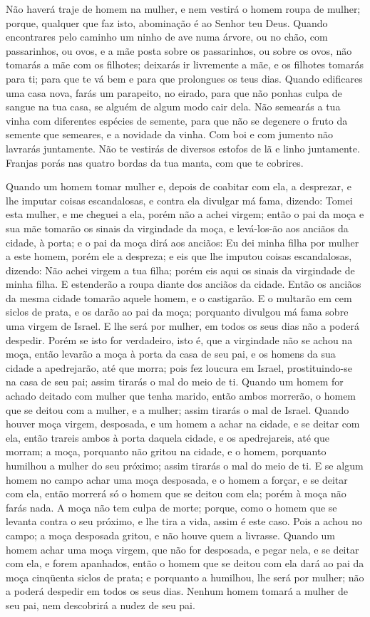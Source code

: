 Não haverá traje de homem na mulher, e nem vestirá o homem roupa
de mulher; porque, qualquer que faz isto, abominação é ao Senhor teu
Deus. Quando encontrares pelo caminho um ninho de ave numa
árvore, ou no chão, com passarinhos, ou ovos, e a mãe posta sobre os
passarinhos, ou sobre os ovos, não tomarás a mãe com os filhotes;
deixarás ir livremente a mãe, e os filhotes tomarás para ti;
para que te vá bem e para que prolongues os teus dias. Quando
edificares uma casa nova, farás um parapeito, no eirado, para que
não ponhas culpa de sangue na tua casa, se alguém de algum modo cair
dela. Não semearás a tua vinha com diferentes espécies de
semente, para que não se degenere o fruto da semente que semeares, e
a novidade da vinha. Com boi e com jumento não lavrarás
juntamente. Não te vestirás de diversos estofos de lã e linho
juntamente. Franjas porás nas quatro bordas da tua manta, com
que te cobrires.

Quando um homem tomar mulher e, depois de coabitar com ela, a
desprezar, e lhe imputar coisas escandalosas, e contra ela
divulgar má fama, dizendo: Tomei esta mulher, e me cheguei a ela,
porém não a achei virgem; então o pai da moça e sua mãe
tomarão os sinais da virgindade da moça, e levá-los-ão aos anciãos
da cidade, à porta; e o pai da moça dirá aos anciãos: Eu dei
minha filha por mulher a este homem, porém ele a despreza; e
eis que lhe imputou coisas escandalosas, dizendo: Não achei virgem a
tua filha; porém eis aqui os sinais da virgindade de minha filha. E
estenderão a roupa diante dos anciãos da cidade. Então os
anciãos da mesma cidade tomarão aquele homem, e o castigarão.
E o multarão em cem siclos de prata, e os darão ao pai da
moça; porquanto divulgou má fama sobre uma virgem de Israel. E lhe
será por mulher, em todos os seus dias não a poderá despedir.
Porém se isto for verdadeiro, isto é, que a virgindade não se
achou na moça, então levarão a moça à porta da casa de seu
pai, e os homens da sua cidade a apedrejarão, até que morra; pois
fez loucura em Israel, prostituindo-se na casa de seu pai; assim
tirarás o mal do meio de ti. Quando um homem for achado
deitado com mulher que tenha marido, então ambos morrerão, o homem
que se deitou com a mulher, e a mulher; assim tirarás o mal de
Israel. Quando houver moça virgem, desposada, e um homem a
achar na cidade, e se deitar com ela, então trareis ambos à
porta daquela cidade, e os apedrejareis, até que morram; a moça,
porquanto não gritou na cidade, e o homem, porquanto humilhou a
mulher do seu próximo; assim tirarás o mal do meio de ti. E
se algum homem no campo achar uma moça desposada, e o homem a
forçar, e se deitar com ela, então morrerá só o homem que se deitou
com ela; porém à moça não farás nada. A moça não tem culpa de
morte; porque, como o homem que se levanta contra o seu próximo, e
lhe tira a vida, assim é este caso. Pois a achou no campo; a
moça desposada gritou, e não houve quem a livrasse. Quando um
homem achar uma moça virgem, que não for desposada, e pegar nela, e
se deitar com ela, e forem apanhados, então o homem que se
deitou com ela dará ao pai da moça cinqüenta siclos de prata; e
porquanto a humilhou, lhe será por mulher; não a poderá despedir em
todos os seus dias. Nenhum homem tomará a mulher de seu pai,
nem descobrirá a nudez de seu pai.

